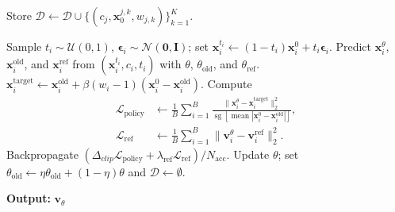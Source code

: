 \documentclass{article} %
\begin{document}
\begin{algorithm}[H]
\begin{algorithmic}[1]
                \State Store
                $\mathcal{D}\leftarrow\mathcal{D}\cup
                \{(c_j,\mathbf{x}_0^{j,k},w_{j,k})\}_{k=1}^{K}$.
            \EndFor

                \State Sample $t_i\sim\mathcal{U}(0,1)$,
                $\boldsymbol{\epsilon}_i\sim\mathcal{N}(\mathbf{0},\mathbf{I})$;
                set $\mathbf{x}_i^{t_i}\leftarrow
                (1-t_i)\mathbf{x}_i^0+t_i\boldsymbol{\epsilon}_i$.
                \State Predict $\mathbf{x}_i^\theta$,
                $\mathbf{x}_i^{\mathrm{old}}$, and $\mathbf{x}_i^{\mathrm{ref}}$
                from $(\mathbf{x}_i^{t_i},c_i,t_i)$ with
                $\theta$, $\theta_{\mathrm{old}}$, and $\theta_{\mathrm{ref}}$.
                \State $\mathbf{x}_i^{\mathrm{target}}\leftarrow
                \mathbf{x}_i^{\mathrm{old}}+
                \beta(w_i-1)(\mathbf{x}_i^0-\mathbf{x}_i^{\mathrm{old}})$.
                \State Compute
                \[
                    \begin{aligned}
                    \mathcal{L}_{\mathrm{policy}}
                    &\leftarrow\frac{1}{B}\sum_{i=1}^{B}
                    \frac{\|\mathbf{x}_i^\theta-\mathbf{x}_i^{\mathrm{target}}\|_2^2}
                    {\operatorname{sg}[\operatorname{mean}
                    |\mathbf{x}_i^0-\mathbf{x}_i^{\mathrm{old}}|]},\\
                    \mathcal{L}_{\mathrm{ref}}
                    &\leftarrow\frac{1}{B}\sum_{i=1}^{B}
                    \|\mathbf{v}_i^\theta-\mathbf{v}_i^{\mathrm{ref}}\|_2^2.
                    \end{aligned}
                \]
                \State Backpropagate
                $(\Delta_{clip}\mathcal{L}_{\mathrm{policy}}+
                \lambda_{\mathrm{ref}}\mathcal{L}_{\mathrm{ref}})/N_{\mathrm{acc}}$.
            \EndFor
            \State Update $\theta$; set
            $\theta_{\mathrm{old}}\leftarrow
            \eta\theta_{\mathrm{old}}+(1-\eta)\theta$ and
            $\mathcal{D}\leftarrow\emptyset$.
        \EndFor
    \end{algorithmic}
    \textbf{Output:} $\mathbf{v}_\theta$
\end{algorithm}
\end{document}
